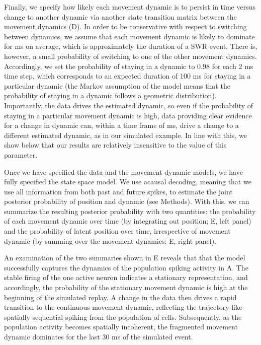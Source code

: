 \documentclass[9pt,lineno]{elife}
\begin{document}
Finally, we specify how likely each movement dynamic is to persist in time versus change to another dynamic via another state transition matrix between the movement dynamics (D). In order to be conservative with respect to switching between dynamics, we assume that each movement dynamic is likely to dominate for  ms on average, which is approximately the duration of a SWR event. There is, however, a small probability of switching to one of the other movement dynamics. Accordingly, we set the probability of staying in a dynamic to 0.98 for each 2 ms time step, which corresponds to an expected duration of 100 ms for staying in a particular dynamic (the Markov assumption of the model means that the probability of staying in a dynamic follows a geometric distribution). Importantly, the data drives the estimated dynamic, so even if the probability of staying in a particular movement dynamic is high, data providing clear evidence for a change in dynamic can, within a time frame of  ms, drive a change to a different estimated dynamic, as in our simulated example. In line with this, we show below that our results are relatively insensitive to the value of this parameter.

Once we have specified the data and the movement dynamic models, we have fully specified the state space model. We use acausal decoding, meaning that we use all information from both past and future spikes, to estimate the joint posterior probability of position and dynamic (see Methods). With this, we can summarize the resulting posterior probability with two quantities: the probability of each movement dynamic over time (by integrating out position; E, left panel) and the probability of latent position over time, irrespective of movement dynamic (by summing over the movement dynamics; E, right panel). 

An examination of the two summaries shown in E reveals that that the model successfully captures the dynamics of the population spiking activity in A. The stable firing of the one active neuron indicates a stationary representation, and accordingly, the probability of the stationary movement dynamic is high at the beginning of the simulated replay. A change in the data then drives a rapid transition to the continuous movement dynamic, reflecting the trajectory-like spatially sequential spiking from the population of cells. Subsequently, as the population activity becomes spatially incoherent, the fragmented movement dynamic dominates for the last 30 ms of the simulated event.
\end{document}
